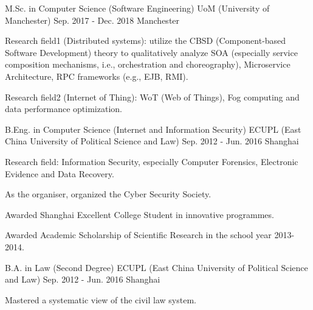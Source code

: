 \begin{cventries}
  \cventry
    {M.Sc. in Computer Science (Software Engineering)}
    {UoM (University of Manchester)}
    {Sep. 2017 - Dec. 2018}
    {Manchester}
    {
      \begin{cvitems}
        \item {Research field1 (Distributed systems): utilize the CBSD (Component-based Software Development) theory to qualitatively analyze SOA (especially service composition mechanisms, i.e., orchestration and choreography), Microservice Architecture, RPC frameworks (e.g., EJB, RMI).}
        \item {Research field2 (Internet of Thing): WoT (Web of Things), Fog computing and data performance optimization.}
      \end{cvitems}
    }
    
  \cventry
    {B.Eng. in Computer Science (Internet and Information Security)}
    {ECUPL (East China University of Political Science and Law)}
    {Sep. 2012 - Jun. 2016}
    {Shanghai}
    {
      \begin{cvitems}
        \item {Research field: Information Security, especially Computer Forensics, Electronic Evidence and Data Recovery.}
        \item {As the organiser, organized the Cyber Security Society.}
        \item {Awarded Shanghai Excellent College Student in innovative programmes.}
        \item {Awarded Academic Scholarship of Scientific Research in the school year 2013-2014.}
      \end{cvitems}
    }
    
  \cventry
    {B.A. in Law (Second Degree)}
    {ECUPL (East China University of Political Science and Law)}
    {Sep. 2012 - Jun. 2016}
    {Shanghai}
    {
      \begin{cvitems}
        \item {Mastered a systematic view of the civil law system.}
      \end{cvitems}
    }
\end{cventries}
